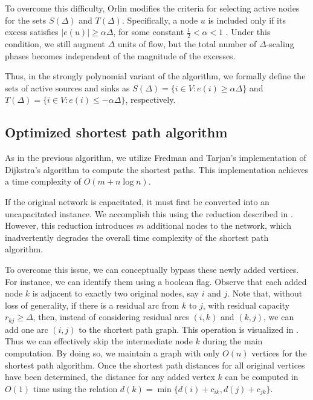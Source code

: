 To overcome this difficulty, Orlin modifies the criteria for selecting active nodes for the sets $S(\Delta)$ and $T(\Delta)$. Specifically, a node $u$ is included only if its excess satisfies $|e(u)| \geq \alpha \Delta$, for some constant $\frac{1}{2} < \alpha < 1$ \cite{orlin1993faster}. Under this condition, we still augment $\Delta$ units of flow, but the total number of $\Delta$-scaling phases becomes independent of the magnitude of the excesses. 

Thus, in the strongly polynomial variant of the algorithm, we formally define the sets of active sources and sinks as $S(\Delta) = \{i \in V \colon e(i) \geq \alpha\Delta\}$ and $T(\Delta) = \{i \in V \colon e(i) \leq -\alpha\Delta\}$, respectively.

\subsection{Optimized shortest path algorithm}
\label{sec:modified_spp}

As in the previous algorithm, we utilize Fredman and Tarjan's implementation of Dijkstra's algorithm \cite{fredman1987} to compute the shortest paths. This implementation achieves a time complexity of $O(m + n\log n)$.

If the original network is capacitated, it must first be converted into an uncapacitated instance. We accomplish this using the reduction described in . However, this reduction introduces $m$ additional nodes to the network, which inadvertently degrades the overall time complexity of the shortest path algorithm.

To overcome this issue, we can conceptually bypass these newly added vertices. For instance, we can identify them using a boolean flag. Observe that each added node $k$ is adjacent to exactly two original nodes, say $i$ and $j$. Note that, without loss of generality, if there is a residual arc from $k$ to $j$, with residual capacity $r_{kj} \geq \Delta$, then, instead of considering residual arcs $(i,k)$ and $(k,j)$, we can add one arc $(i,j)$ to the shortest path graph. This operation is visualized in . Thus we can effectively skip the intermediate node $k$ during the main computation. By doing so, we maintain a graph with only $O(n)$ vertices for the shortest path algorithm. Once the shortest path distances for all original vertices have been determined, the distance for any added vertex $k$ can be computed in $O(1)$ time using the relation $d(k) = \min \{ d(i) + c_{ik}, d(j) + c_{jk} \}$.

